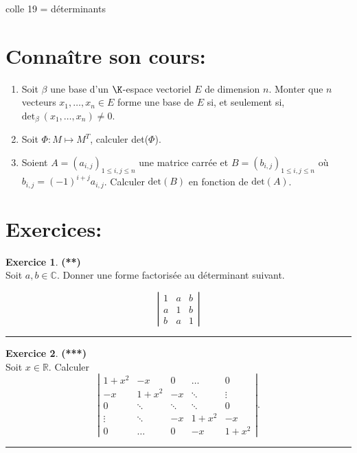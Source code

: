\documentclass[a4paper,11pt]{article}
\theoremstyle{definition}
\newtheorem{exo}{Exercice} %
\begin{document}
	
	
	\begin{center}
		\Large \sc colle 19 = déterminants
	\end{center}
\raggedright


\section*{Connaître son cours:}
\begin{enumerate}
	\item Soit $\beta$ une base d’un $\K $-espace vectoriel $E$ de dimension $n $. Monter  que $n$ vecteurs $x_1 ,\dots , x_n \in E$ forme une base de $E$ si, et seulement si,
	$\text{det}_\beta \ (x_1 , \dots , x_n ) \neq 0$.
	\item Soit $\Phi : M \longmapsto M^T$, calculer det($\Phi$).
	\item 	Soient $A=(a_{i,j})_{1\leqslant i,j\leqslant n}$ une matrice carrée et $B= (b_{i,j})_{1\leqslant i,j\leqslant n}$ où $b_{i,j}=(-1)^{i+j}a_{i,j}$. Calculer $\text{det}(B)$ en fonction de $\text{det}(A)$. 
\end{enumerate}

\section*{Exercices:} 



\begin{exo}\textbf{(**)}\quad\\[0.25cm]
Soit $a, b \in \mathbb{C}$. Donner une forme factorisée au déterminant suivant.

$$
\left|\begin{array}{lll}
1 & a & b \\
a & 1 & b \\
b & a & 1
\end{array}\right|
$$
	
	\centering
	\rule{1\linewidth}{0.6pt}
\end{exo}
	
\begin{exo}\textbf{(***)}\quad\\[0.25cm]
	Soit $x\in\mathbb R$. Calculer
	$$\left|
	\begin{array}{ccccc}
	1+x^2&-x&0&\dots&0\\
	-x&1+x^2&-x&\ddots&\vdots\\
	0&\ddots&\ddots&\ddots&0\\
	\vdots&\ddots&-x&1+x^2&-x\\
	0&\dots&0&-x&1+x^2
	\end{array}
	\right|.
	$$
	\centering
	\rule{1\linewidth}{0.6pt}
\end{exo}
\end{document}
